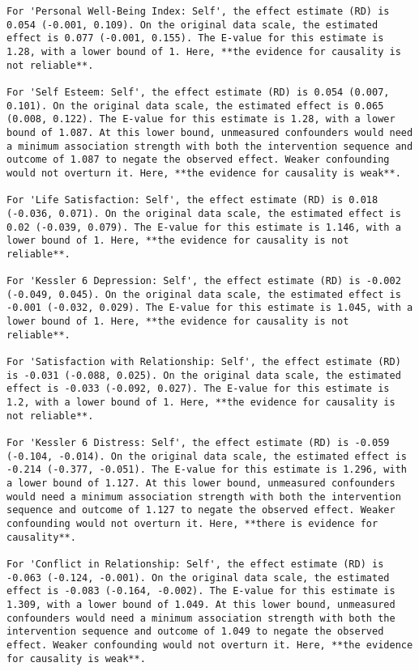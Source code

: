 \documentclass[
  singlecolumn]{article}
\begin{document}
\begin{verbatim}
For 'Personal Well-Being Index: Self', the effect estimate (RD) is 0.054 (-0.001, 0.109). On the original data scale, the estimated effect is 0.077 (-0.001, 0.155). The E-value for this estimate is 1.28, with a lower bound of 1. Here, **the evidence for causality is not reliable**.

For 'Self Esteem: Self', the effect estimate (RD) is 0.054 (0.007, 0.101). On the original data scale, the estimated effect is 0.065 (0.008, 0.122). The E-value for this estimate is 1.28, with a lower bound of 1.087. At this lower bound, unmeasured confounders would need a minimum association strength with both the intervention sequence and outcome of 1.087 to negate the observed effect. Weaker confounding would not overturn it. Here, **the evidence for causality is weak**.

For 'Life Satisfaction: Self', the effect estimate (RD) is 0.018 (-0.036, 0.071). On the original data scale, the estimated effect is 0.02 (-0.039, 0.079). The E-value for this estimate is 1.146, with a lower bound of 1. Here, **the evidence for causality is not reliable**.

For 'Kessler 6 Depression: Self', the effect estimate (RD) is -0.002 (-0.049, 0.045). On the original data scale, the estimated effect is -0.001 (-0.032, 0.029). The E-value for this estimate is 1.045, with a lower bound of 1. Here, **the evidence for causality is not reliable**.

For 'Satisfaction with Relationship: Self', the effect estimate (RD) is -0.031 (-0.088, 0.025). On the original data scale, the estimated effect is -0.033 (-0.092, 0.027). The E-value for this estimate is 1.2, with a lower bound of 1. Here, **the evidence for causality is not reliable**.

For 'Kessler 6 Distress: Self', the effect estimate (RD) is -0.059 (-0.104, -0.014). On the original data scale, the estimated effect is -0.214 (-0.377, -0.051). The E-value for this estimate is 1.296, with a lower bound of 1.127. At this lower bound, unmeasured confounders would need a minimum association strength with both the intervention sequence and outcome of 1.127 to negate the observed effect. Weaker confounding would not overturn it. Here, **there is evidence for causality**.

For 'Conflict in Relationship: Self', the effect estimate (RD) is -0.063 (-0.124, -0.001). On the original data scale, the estimated effect is -0.083 (-0.164, -0.002). The E-value for this estimate is 1.309, with a lower bound of 1.049. At this lower bound, unmeasured confounders would need a minimum association strength with both the intervention sequence and outcome of 1.049 to negate the observed effect. Weaker confounding would not overturn it. Here, **the evidence for causality is weak**.


\end{verbatim}
\end{document}
